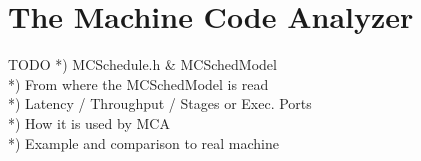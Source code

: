 
\section{The Machine Code Analyzer}


\begin{frame}{TODO}
*) MCSchedule.h \& MCSchedModel\\
*) From where the MCSchedModel is read\\
*) Latency / Throughput / Stages or Exec. Ports \\
*) How it is used by MCA\\
*) Example and comparison to real machine\\
\end{frame}

